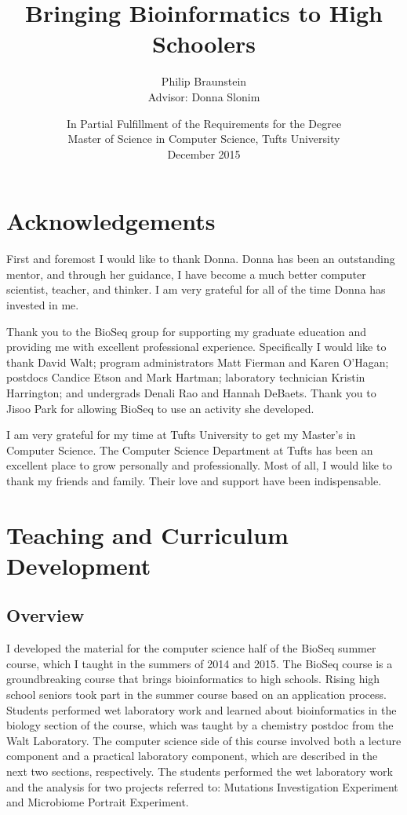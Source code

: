 \documentclass{report}
\title{Bringing Bioinformatics to High Schoolers}
\author{Philip Braunstein\\ Advisor: Donna Slonim}
\date{
In Partial Fulfillment of the Requirements for the Degree \\
Master of Science in Computer Science, Tufts University \\
December 2015
}
\begin{document}

\maketitle

\chapter*{Acknowledgements}
First and foremost I would like to thank Donna. Donna has been an outstanding mentor, and through her guidance, I have become a much better computer scientist, teacher, and thinker. I am very grateful for all of the time Donna has invested in me.

Thank you to the BioSeq group for supporting my graduate education and providing me with excellent professional experience. Specifically I would like to thank David Walt; program administrators Matt Fierman and Karen O'Hagan; postdocs Candice Etson and Mark Hartman; laboratory technician Kristin Harrington; and undergrads Denali Rao and Hannah DeBaets. Thank you to Jisoo Park for allowing BioSeq to use an activity she developed.

I am very grateful for my time at Tufts University to get my Master's in Computer Science. The Computer Science Department at Tufts has been an excellent place to grow personally and professionally. Most of all, I would like to thank my friends and family. Their love and support have been indispensable.

\tableofcontents

\chapter{Teaching and Curriculum Development}
\section{Overview}
I developed the material for the computer science half of the BioSeq summer course, which I taught in the summers of 2014 and 2015. The BioSeq course is a groundbreaking course that brings bioinformatics to high schools. Rising high school seniors took part in the summer course based on an application process. Students performed wet laboratory work and learned about bioinformatics in the biology section of the course, which was taught by a chemistry postdoc from the Walt Laboratory. The computer science side of this course involved both a lecture component and a practical laboratory component, which are described in the next two sections, respectively. The students performed the wet laboratory work and the analysis for two projects referred to: Mutations Investigation Experiment and Microbiome Portrait Experiment. 
\end{document}
